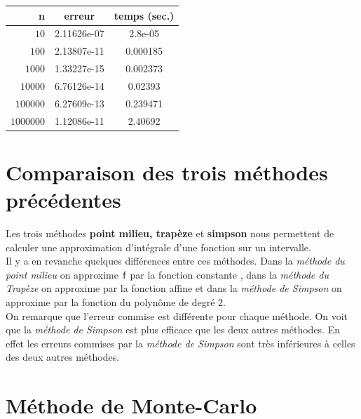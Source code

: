 \documentclass{article}
\begin{document}
\begin{center}
\begin{tabular}{r | c | c}
{n} & erreur & temps (sec.)\\
\hline
$10$ & {2.11626e-07} & {2.8e-05}\\
$100$ & {2.13807e-11 } & {0.000185}\\
$1000$ & {1.33227e-15} & {0.002373}\\
$10000$ & {6.76126e-14} & {0.02393}\\
$100000$ & {6.27609e-13} & {0.239471}\\
$1000000$ & {1.12086e-11} & {2.40692}
\end{tabular}
\end{center}

\section{Comparaison des trois méthodes précédentes}

Les trois méthodes \textbf{point milieu, trapèze} et \textbf{simpson} nous permettent de calculer une approximation d'intégrale d'une fonction sur un intervalle. 
\\

	
	Il y a en revanche quelques différences entre ces méthodes. Dans la \textit{méthode du point milieu} on approxime \texttt{f} par la fonction constante , dans la \textit{méthode du Trapèze} on approxime par la fonction affine et dans la \textit{méthode de Simpson} on approxime par la fonction du polynôme de degré 2. 
\\

	On remarque que l'erreur commise est différente pour chaque méthode. On voit que la \textit{méthode de Simpson} est plus efficace que les deux autres méthodes. En effet les erreurs commises par la \textit{méthode de Simpson} sont très inférieures à celles des deux autres méthodes.

\section{Méthode de Monte-Carlo}
\end{document}
